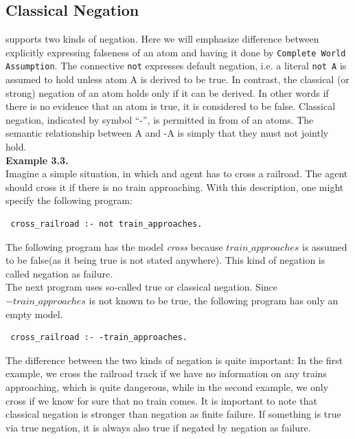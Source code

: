 \documentclass[14pt,a4paper, titlepage]{article}
\begin{document}
\subsection{Classical Negation}
\dlvhex{} supports two kinds of negation. Here we will emphasize difference between explicitly expressing falseness of an atom and having it done by \texttt{Complete World Assumption}. The connective \texttt{not} expresses default negation, i.e. a literal \texttt{not A} is assumed to hold unless atom A is derived to be true. In contrast, the classical (or strong) negation of an atom holds only if it can be derived. In other words if there is no evidence that an atom is true, it is considered to be false. Classical negation, indicated by symbol \enquote{-}, is permitted in from of an atoms. The semantic relationship between A and -A is simply that they must not jointly hold. 
\\ \textbf{Example 3.3.}
\\ Imagine a simple situation, in which and agent has to cross a railroad. The agent should cross it if there is no train approaching. With this description, one might specify the following program:
\begin{lstlisting}
 cross_railroad :- not train_approaches.
\end{lstlisting}
The following program has the model \textit{cross} because $train\_approaches$ is assumed to be false(as it being true is not stated anywhere). This kind of negation is called negation as failure.\\The next program uses so-called true or classical negation. Since \textit{$-train\_approaches$} is not known to be true, the following program has only an empty model.
\begin{lstlisting}
 cross_railroad :- -train_approaches.
\end{lstlisting}
The difference between the two kinds of negation is quite important: In the first example, we cross the railroad track if we have no information on any trains approaching, which is quite dangerous, while in the second example, we only cross if we know for sure that no train comes. It is important to note that classical negation is stronger than negation as finite failure. If something is true via true negation, it is always also true if negated by negation as failure.
\end{document}
